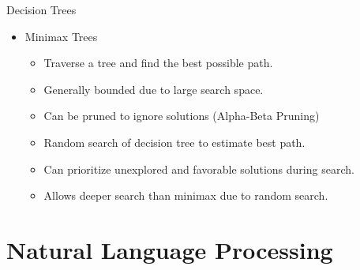 \documentclass[11pt]{beamer}
\begin{document}
\begin{frame}{Decision Trees}
\begin{itemize}
    \item Minimax Trees
    \begin{itemize}
        \item Traverse a tree and find the best possible path.
        \item Generally bounded due to large search space.
        \item Can be pruned to ignore solutions (Alpha-Beta Pruning)
    \end{itemize}
    \begin{itemize}
        \item Random search of decision tree to estimate best path.
        \item Can prioritize unexplored and favorable solutions during search.
        \item Allows deeper search than minimax due to random search.
    \end{itemize}
\end{itemize}
\end{frame}

\section{Natural Language Processing}
\end{document}
